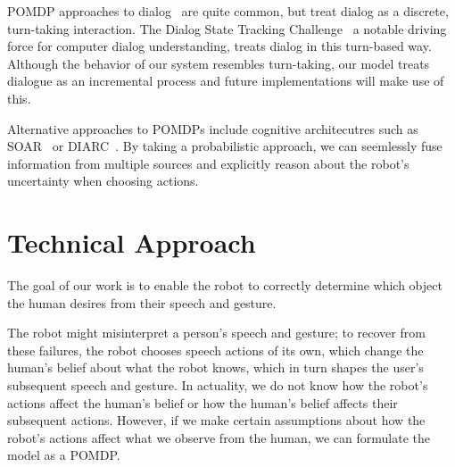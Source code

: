 \documentclass[letterpaper]{article}
\newcommand{\stnote}[1]{\textcolor{blue}{\textbf{ST: #1}}}
\begin{document}
POMDP approaches to dialog~\cite{young13} are quite common, but treat dialog
as a discrete, turn-taking interaction. The Dialog State Tracking
Challenge~\cite{williams2013dialog} a notable driving force for computer
dialog understanding, treats dialog in this turn-based way. Although the behavior of our system resembles turn-taking, our model treats dialogue as an incremental process and future implementations will make use of this. 


Alternative approaches to
POMDPs include cognitive architecutres such as SOAR~\cite{soar} or
DIARC~\cite{diarc}.  By taking a probabilistic approach, we can seemlessly
fuse information from multiple sources and explicitly reason about the
robot's uncertainty when choosing actions.



\section{Technical Approach}


The goal of our work is to enable the robot to correctly determine which object the human desires from their speech and gesture.

The robot might misinterpret a person's speech and gesture; to recover from these failures, the robot chooses speech actions of its own, which change the human's belief about what the robot knows, which in turn shapes the user's subsequent speech and gesture.
In actuality, we do not know how the robot's actions affect the human's belief or how the human's belief affects their subsequent actions. However, if we make certain assumptions about how the robot's actions affect what we observe from the human, we can formulate the model as a POMDP. 




\end{document}
